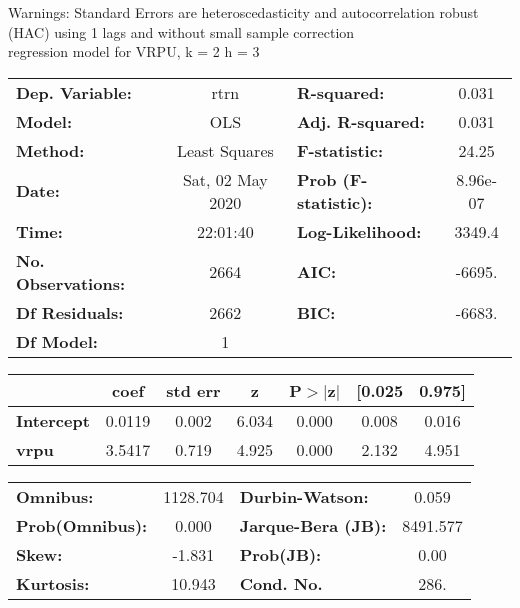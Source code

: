 Warnings: \newline
 [1] Standard Errors are heteroscedasticity and autocorrelation robust (HAC) using 1 lags and without small sample correction\\ 

regression model for VRPU, k = 2 h = 3\begin{center}
\begin{tabular}{lclc}
\toprule
\textbf{Dep. Variable:}    &       rtrn       & \textbf{  R-squared:         } &     0.031   \\
\textbf{Model:}            &       OLS        & \textbf{  Adj. R-squared:    } &     0.031   \\
\textbf{Method:}           &  Least Squares   & \textbf{  F-statistic:       } &     24.25   \\
\textbf{Date:}             & Sat, 02 May 2020 & \textbf{  Prob (F-statistic):} &  8.96e-07   \\
\textbf{Time:}             &     22:01:40     & \textbf{  Log-Likelihood:    } &    3349.4   \\
\textbf{No. Observations:} &        2664      & \textbf{  AIC:               } &    -6695.   \\
\textbf{Df Residuals:}     &        2662      & \textbf{  BIC:               } &    -6683.   \\
\textbf{Df Model:}         &           1      & \textbf{                     } &             \\
\bottomrule
\end{tabular}
\begin{tabular}{lcccccc}
                   & \textbf{coef} & \textbf{std err} & \textbf{z} & \textbf{P$> |$z$|$} & \textbf{[0.025} & \textbf{0.975]}  \\
\midrule
\textbf{Intercept} &       0.0119  &        0.002     &     6.034  &         0.000        &        0.008    &        0.016     \\
\textbf{vrpu}      &       3.5417  &        0.719     &     4.925  &         0.000        &        2.132    &        4.951     \\
\bottomrule
\end{tabular}
\begin{tabular}{lclc}
\textbf{Omnibus:}       & 1128.704 & \textbf{  Durbin-Watson:     } &    0.059  \\
\textbf{Prob(Omnibus):} &   0.000  & \textbf{  Jarque-Bera (JB):  } & 8491.577  \\
\textbf{Skew:}          &  -1.831  & \textbf{  Prob(JB):          } &     0.00  \\
\textbf{Kurtosis:}      &  10.943  & \textbf{  Cond. No.          } &     286.  \\
\bottomrule
\end{tabular}
\end{center}

